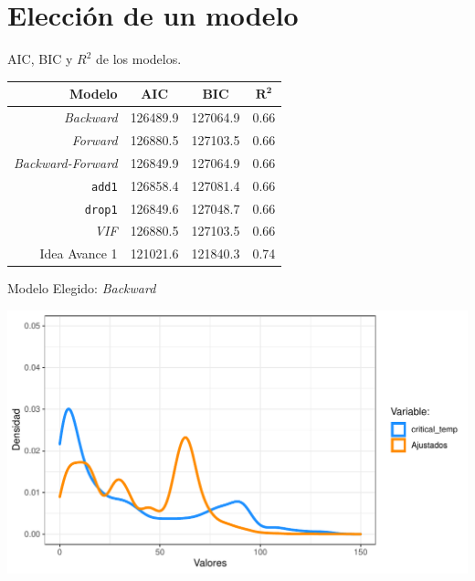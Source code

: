 \documentclass[11pt]{beamer}\usepackage{knitr}
\newcommand{\cod}[1]{\texttt{\frenchspacing#1}}
\begin{document}
\section{Elección de un modelo}

\begin{frame}{AIC, BIC y $R^2$ de los modelos.}
		\begin{center}
			\begin{tabular}{| r | c | c | c |}
				\hline
				\textbf{Modelo} & \textbf{AIC} & \textbf{BIC} & $\mathbf{R^2}$
				\\ \hline
				\textit{Backward} & 126489.9 &  127064.9 & 0.66 \\
				\textit{Forward} & 126880.5 & 127103.5 & 0.66 \\
				\textit{Backward-Forward} & 126849.9 & 127064.9 & 0.66\\
				\cod{add1} & 126858.4 &  127081.4& 0.66\\
				\cod{drop1} & 126849.6 & 127048.7 & 0.66\\
				\textit{VIF} & 126880.5 & 127103.5 & 0.66 \\
				Idea Avance 1 & 121021.6 & 121840.3 & 0.74
				\\ \hline
			\end{tabular}
		\end{center}
\end{frame}

\begin{frame}[fragile]{Modelo Elegido: \textit{Backward}}

\begin{knitrout}\footnotesize
{}\color{fgcolor}

{\centering \includegraphics[width=\maxwidth]{figure/unnamed-chunk-3-1} 

}



\end{knitrout}

\end{frame}
\end{document}
